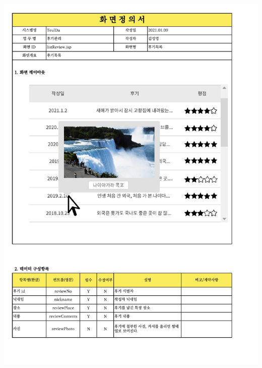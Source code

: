 {{{{{{{{{{{{{{{{{{{{{{{{{{{{{{{{\includegraphics[width=20cm]{./Figure/Analysis/Display/review/review_07.pdf} \\
}}}}}}}}}}}}}}}}}}}}}}}}}}}}}}}}
